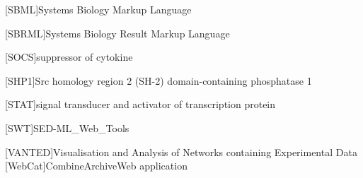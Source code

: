 \begin{acronym}[acrmeta]
        [SBML]{Systems Biology Markup Language}
        
        [SBRML]{Systems Biology Result Markup Language}
        
        [SOCS]{suppressor of cytokine}
        
        [SHP1]{Src homology region 2 (SH-2) domain-containing phosphatase 1}
        
        [STAT]{signal transducer and activator of transcription protein}        
                
        [SWT]{SED-ML\_Web\_Tools}
        
        [VANTED]{Visualisation and Analysis of Networks containing Experimental Data}
        [WebCat]{CombineArchiveWeb application}

    \end{acronym}